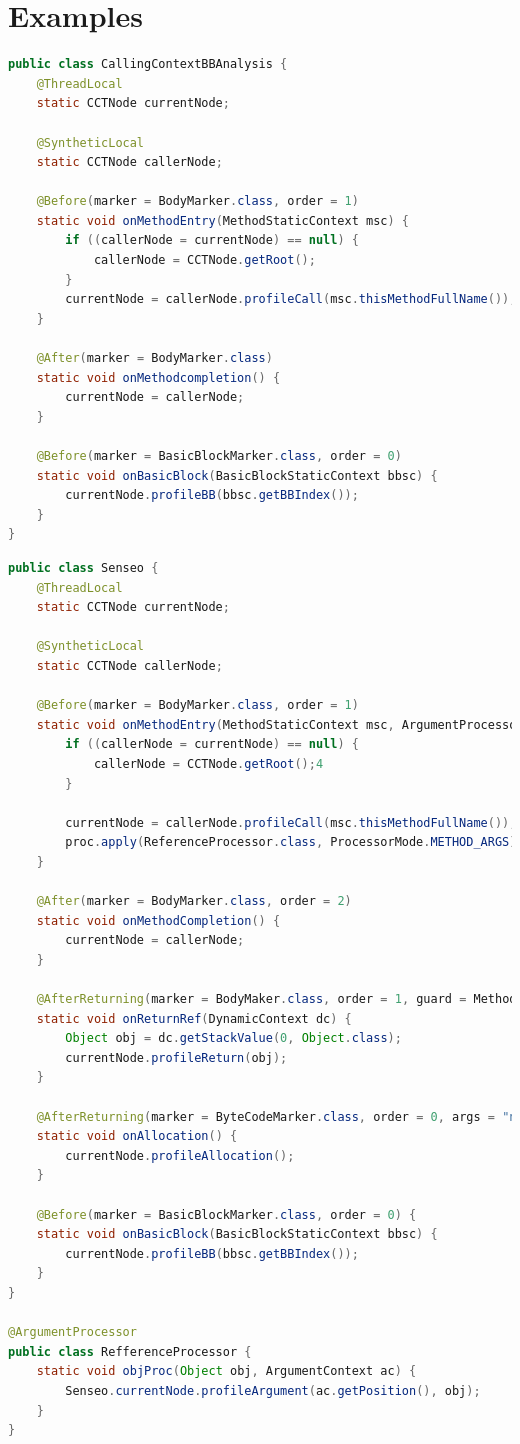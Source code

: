 \documentclass[a4paper]{report}
\begin{document}
\section{Examples}
\begin{lstlisting}[language=Java,caption=Aspect for calling context-aware profiling.,label=lst:DiSL_ExampleProfiler]
public class CallingContextBBAnalysis {
	@ThreadLocal
	static CCTNode currentNode;

	@SyntheticLocal
	static CCTNode callerNode;

	@Before(marker = BodyMarker.class, order = 1)
	static void onMethodEntry(MethodStaticContext msc) {
		if ((callerNode = currentNode) == null) {
			callerNode = CCTNode.getRoot();
		}
		currentNode = callerNode.profileCall(msc.thisMethodFullName());
	}

	@After(marker = BodyMarker.class)
	static void onMethodcompletion() {
		currentNode = callerNode;
	}

	@Before(marker = BasicBlockMarker.class, order = 0)
	static void onBasicBlock(BasicBlockStaticContext bbsc) {
		currentNode.profileBB(bbsc.getBBIndex());
	}
}
\end{lstlisting}
\begin{lstlisting}[language=Java,caption=Example of collecting run-time information.,label=lst:DiSL_ExampleSenseo]
public class Senseo {
	@ThreadLocal
	static CCTNode currentNode;
	
	@SyntheticLocal
	static CCTNode callerNode;	
	
	@Before(marker = BodyMarker.class, order = 1)
	static void onMethodEntry(MethodStaticContext msc, ArgumentProcessorContext proc) {
		if ((callerNode = currentNode) == null) {
			callerNode = CCTNode.getRoot();4
		}
			
		currentNode = callerNode.profileCall(msc.thisMethodFullName());
		proc.apply(ReferenceProcessor.class, ProcessorMode.METHOD_ARGS);
	}
	
	@After(marker = BodyMarker.class, order = 2)
	static void onMethodCompletion() {
		currentNode = callerNode;
	}
	
	@AfterReturning(marker = BodyMaker.class, order = 1, guard = MethodReturnsRef.class)
	static void onReturnRef(DynamicContext dc) {
		Object obj = dc.getStackValue(0, Object.class);
		currentNode.profileReturn(obj);
	}
	
	@AfterReturning(marker = ByteCodeMarker.class, order = 0, args = "new,newarray,anewarray,multianewarray")
	static void onAllocation() {
		currentNode.profileAllocation();
	}
	
	@Before(marker = BasicBlockMarker.class, order = 0) {
	static void onBasicBlock(BasicBlockStaticContext bbsc) {
		currentNode.profileBB(bbsc.getBBIndex());
	}
}

@ArgumentProcessor
public class RefferenceProcessor {
	static void objProc(Object obj, ArgumentContext ac) {
		Senseo.currentNode.profileArgument(ac.getPosition(), obj);
	}
}	
\end{lstlisting}
\end{document}
